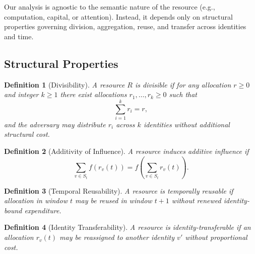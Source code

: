 \documentclass[journal]{IEEEtran}
\newtheorem{definition}{Definition}
\begin{document}
	Our analysis is agnostic to the semantic nature of the resource
	(e.g., computation, capital, or attention).
	Instead, it depends only on structural properties governing
	division, aggregation, reuse, and transfer across identities and time.
	
	\subsection{Structural Properties}
	
	\begin{definition}[Divisibility]
		A resource $R$ is \emph{divisible}
		if for any allocation $r \ge 0$ and integer $k \ge 1$
		there exist allocations $r_1,\dots,r_k \ge 0$ such that
		\[
		\sum_{i=1}^{k} r_i = r,
		\]
		and the adversary may distribute $r_i$
		across $k$ identities without additional structural cost.
	\end{definition}
	
	\begin{definition}[Additivity of Influence]
		A resource induces \emph{additive influence} if
		\[
		\sum_{v \in S_t} f(r_v(t))
		=
		f\!\left(\sum_{v \in S_t} r_v(t)\right).
		\]
	\end{definition}
	
	\begin{definition}[Temporal Reusability]
		A resource is \emph{temporally reusable}
		if allocation in window $t$
		may be reused in window $t+1$
		without renewed identity-bound expenditure.
	\end{definition}
	
	\begin{definition}[Identity Transferability]
		A resource is \emph{identity-transferable}
		if an allocation $r_v(t)$ may be reassigned
		to another identity $v'$
		without proportional cost.
	\end{definition}
	
\end{document}
